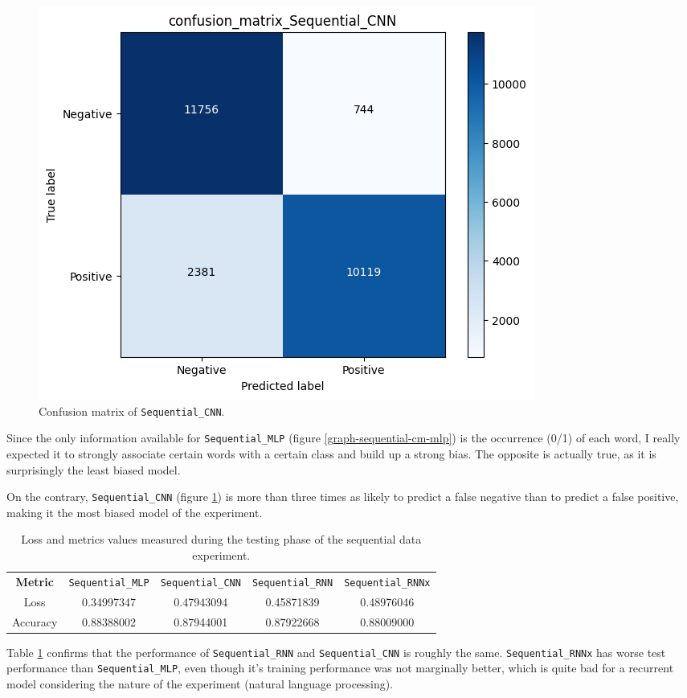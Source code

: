\begin{figure}[!h]
\begin{minipage}{0.48\textwidth}
        \includegraphics[width=\linewidth]{obrazky-figures/Sequential_experiment/confusion_matrix_Sequential_CNN_2023-04-07_16:57:15.png}
        \caption{Confusion matrix of \texttt{Sequential\_CNN}.}
        \label{graph-sequential-cm-cnn}
    \end{minipage}
\end{figure}
Since the only information available for \texttt{Sequential\_MLP} (figure \ref{graph-sequential-cm-mlp})
is the occurrence (0/1) of each word,
I really expected it to strongly associate certain words with a certain class and build up a strong bias.
The opposite is actually true, as it is surprisingly the least biased model.

On the contrary, \texttt{Sequential\_CNN} (figure \ref{graph-sequential-cm-cnn})
is more than three times as likely to predict a false negative than to
predict a false positive, making it the most biased model of the experiment.


\begin{table}[!h]
\centering
\begin{tabular}{|c|c|c|c|c|}
    \cline{1-5}
    \textbf{Metric} & \texttt{Sequential\_MLP} & \texttt{Sequential\_CNN} & \texttt{Sequential\_RNN} &
    \texttt{Sequential\_RNNx} \\
    \cline{1-5}
    Loss & 0.34997347 & 0.47943094 & 0.45871839 & 0.48976046 \\
    \cline{1-5}
    Accuracy & 0.88388002 & 0.87944001 & 0.87922668 & 0.88009000 \\
    \cline{1-5}
\end{tabular}
\caption{Loss and metrics values measured during the testing phase of the sequential data experiment.}
\label{table:sequential-test}
\end{table}
Table \ref{table:sequential-test} confirms that the performance of \texttt{Sequential\_RNN} and
\texttt{Sequential\_CNN} is roughly the same. \texttt{Sequential\_RNNx} has worse test performance than
\texttt{Sequential\_MLP}, even though it's training performance was not marginally better, which is quite
bad for a recurrent model considering the nature of the experiment (natural language processing).


